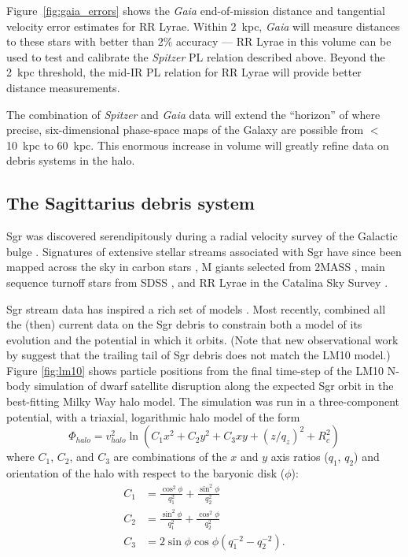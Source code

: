 \documentclass{emulateapj}
\begin{document}
Figure~\ref{fig:gaia_errors} shows the {\it Gaia} end-of-mission distance
and tangential velocity error estimates for RR Lyrae. Within 2~kpc, {\it Gaia} will measure distances to these stars with
better than 2\% accuracy --- RR Lyrae in this volume can be used to
test and calibrate the {\it Spitzer} PL relation described above. Beyond the
2~kpc threshold, the mid-IR PL relation for RR Lyrae will provide better 
distance measurements. 

The combination of {\it Spitzer} and {\it Gaia} data will 
extend the ``horizon'' of where precise, six-dimensional phase-space 
maps of the Galaxy are possible from $<$10~kpc to 60~kpc. This enormous 
increase in volume will greatly refine data on debris systems in the halo.

\subsection{The Sagittarius debris system}
\label{sec:sgr}
Sgr was discovered serendipitously during a radial velocity 
survey of the Galactic bulge \citep{ibata94}. 
Signatures of extensive stellar
streams associated with Sgr have since  been
mapped across the sky in carbon stars \citep{totten98}, M giants
selected from 2MASS \citep{majewski03}, main
sequence turnoff stars from SDSS
\citep{belokurov06}, and RR Lyrae in the Catalina Sky Survey
\citep{drake13}. 

Sgr stream data has inspired a rich set of  models 
\citep[e.g.,][]{johnston99b, fellhauer06}.
Most recently, \citet[][hereafter LM10]{law10} combined all
the (then) current data on the Sgr debris to constrain both a model of its evolution
and the potential in which it orbits. (Note that new observational work by 
\citet{belokurov13} suggest that the trailing tail of Sgr debris does not
match the LM10 model.)
Figure \ref{fig:lm10} shows particle positions
from the final time-step of the LM10 N-body
simulation of dwarf satellite disruption along the expected Sgr orbit
in the best-fitting Milky Way halo model. The simulation was
run in a three-component potential, with a triaxial, logarithmic halo
model of the form
\begin{equation}
  \Phi_{halo} = v_{halo}^2 \ln(C_1 x^2 + C_2 y^2 + C_3 xy + (z/q_z)^2 + R_c^2)
\end{equation}
where $C_1$, $C_2$, and $C_3$ are combinations of the $x$ and $y$ axis
ratios ($q_1$, $q_2$) and orientation of the halo with respect to the
baryonic disk ($\phi$):
\begin{align}
  C_1 &= \frac{\cos^2\phi}{q_1^2} + \frac{\sin^2\phi}{q_2^2}\\
  C_2 &= \frac{\sin^2\phi}{q_1^2} + \frac{\cos^2\phi}{q_2^2}\\
  C_3 &= 2\sin\phi\cos\phi \left(q_1^{-2} - q_2^{-2}\right).
\end{align}
\end{document}
